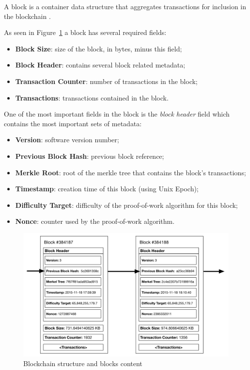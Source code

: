 A block is a container data structure that aggregates transactions for inclusion in the blockchain \cite{Antonopoulos2014}.

As seen in Figure~\ref{fig:blockchain-structure} a block has several required fields:

\begin{itemize}
  \item \textbf{Block Size}: size of the block, in bytes, minus this field;
  \item \textbf{Block Header}: contains several block related metadata;
  \item \textbf{Transaction Counter}: number of transactions in the block;
  \item \textbf{Transactions}: transactions contained in the block.
\end{itemize}
One of the most important fields in the block is the \textit{block header} field which contains the most important sets of metadata:

\begin{itemize}
  \item \textbf{Version}: software version number;
  \item \textbf{Previous Block Hash}: previous block reference;
  \item \textbf{Merkle Root}: root of the merkle tree that contains the block's transactions;
  \item \textbf{Timestamp}: creation time of this block (using Unix Epoch);
  \item \textbf{Difficulty Target}: difficulty of the proof-of-work algorithm for this block;
  \item \textbf{Nonce}: counter used by the proof-of-work algorithm.
\end{itemize}

\begin{figure}[htb]
  \centering
  \includegraphics[scale=0.5]{Figures/blockchain-structure.pdf}
  \caption{Blockchain structure and blocks content}
\label{fig:blockchain-structure}
\end{figure}

